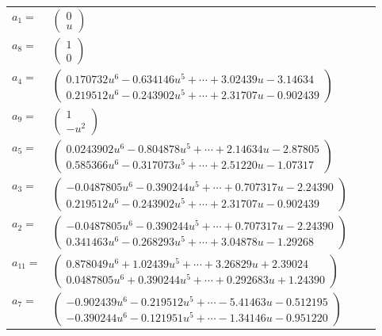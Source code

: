 \documentclass[1p]{elsarticle_modified}
\theoremstyle{definition}
\begin{document}
\begin{tabular}{m{7pt} m{180pt} m{7pt} m{180pt} }
\flushright $a_{1}=$&$\begin{pmatrix}0\\u\end{pmatrix}$ \\
\flushright $a_{8}=$&$\begin{pmatrix}1\\0\end{pmatrix}$ \\
\flushright $a_{4}=$&$\begin{pmatrix}0.170732 u^{6}-0.634146 u^{5}+\cdots+3.02439 u-3.14634\\0.219512 u^{6}-0.243902 u^{5}+\cdots+2.31707 u-0.902439\end{pmatrix}$ \\
\flushright $a_{9}=$&$\begin{pmatrix}1\\- u^2\end{pmatrix}$ \\
\flushright $a_{5}=$&$\begin{pmatrix}0.0243902 u^{6}-0.804878 u^{5}+\cdots+2.14634 u-2.87805\\0.585366 u^{6}-0.317073 u^{5}+\cdots+2.51220 u-1.07317\end{pmatrix}$ \\
\flushright $a_{3}=$&$\begin{pmatrix}-0.0487805 u^{6}-0.390244 u^{5}+\cdots+0.707317 u-2.24390\\0.219512 u^{6}-0.243902 u^{5}+\cdots+2.31707 u-0.902439\end{pmatrix}$ \\
\flushright $a_{2}=$&$\begin{pmatrix}-0.0487805 u^{6}-0.390244 u^{5}+\cdots+0.707317 u-2.24390\\0.341463 u^{6}-0.268293 u^{5}+\cdots+3.04878 u-1.29268\end{pmatrix}$ \\
\flushright $a_{11}=$&$\begin{pmatrix}0.878049 u^{6}+1.02439 u^{5}+\cdots+3.26829 u+2.39024\\0.0487805 u^{6}+0.390244 u^{5}+\cdots+0.292683 u+1.24390\end{pmatrix}$ \\
\flushright $a_{7}=$&$\begin{pmatrix}-0.902439 u^{6}-0.219512 u^{5}+\cdots-5.41463 u-0.512195\\-0.390244 u^{6}-0.121951 u^{5}+\cdots-1.34146 u-0.951220\end{pmatrix}$ \\

\end{tabular}
\end{document}

